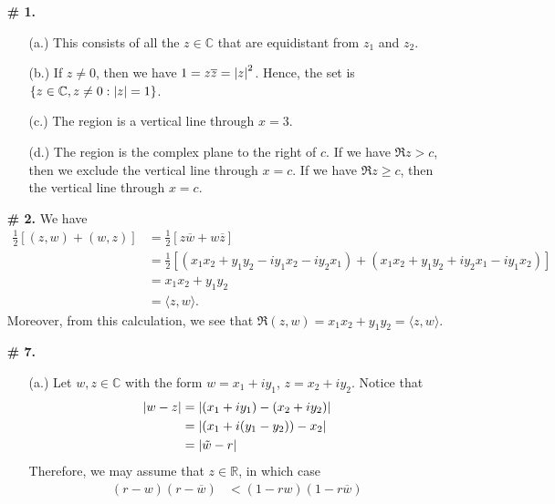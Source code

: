 \documentclass[a4paper,12pt]{article} %
\theoremstyle{plain}
\theoremstyle{definition}
\newcommand{\C}{\mathbb{C}}
\newcommand{\R}{\mathbb{R}}
\begin{document}
 \begin{enumerate}
   \item[\textbf{\# 1.}] 
     \begin{itemize}
       \item[(a.)]  This consists of all the $z \in \C$ that are equidistant from $z_1$ and $z_2$.
       \item[(b.)]  If $z \neq 0$, then we have $1 = z \overline{z} = \abs{z}^2$.  Hence, the set is $\{z \in \C, z \neq 0 : \abs{z} = 1\}$. 
       \item[(c.)]  The region is a vertical line through $x = 3$. 
       \item[(d.)]  The region is the complex plane to the right of $c$.  If we have $\Re z > c$, then we exclude the vertical line through  $x = c$.  If we have  $\Re z \ge c$, then the vertical line through $x =c$.
     \end{itemize}
   \item[\textbf{\# 2.}] 
     We have
     \begin{align*}
       \frac{1}{2}[(z,w) + (w,z)] &= \frac{1}{2}[z\overline{w} + w \overline{z}] \\
                                  &= \frac{1}{2}[(x_1x_2 + y_1 y_2 - iy_1 x_2 - i y_2 x_1) + (x_1 x_2 + y_1 y_2 + i y_2 x_1 - i y_1 x_2)] \\
                                  &= x_1 x_2 + y_1 y_2 \\
                                  &= \langle z, w\rangle.
     \end{align*}
     Moreover, from this calculation, we see that $\Re(z,w) = x_1x_2 + y_1 y_2 = \langle z, w\rangle$.
   \item[\textbf{\# 7.}] 
     \begin{itemize}
       \item[(a.)]  Let $w,z \in \C$ with the form $w = x_1 + i y_1$, $z = x_2 + i y_2$. Notice that 
         \begin{align*}
           \abs{w-z} &= \abs{(x_1 + i y_1) - (x_2 + i y_2)} \\
                                               &= \abs{(x_1 + i (y_1 - y_2)) - x_2} \\
                                               &= \abs{\tilde{w} - r}
         \end{align*}
         Therefore, we may assume that $z \in \R$, in which case  
         \begin{align*}
           (r - w)(r - \overline{w}) &<  (1-rw)(1 - r\overline{w}) \\

\end{align*}
\end{itemize}
\end{enumerate}
\end{document}
